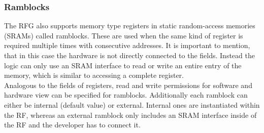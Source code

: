 \subsubsection{Ramblocks}\label{section::ramblocks}
The RFG also supports memory type registers in static random-access memories (SRAMs) called ramblocks. These are used when the same kind of register is required multiple times with consecutive addresses. It is important to mention, that in this case the hardware is not directly connected to the fields. Instead the logic can only use an SRAM interface to read or write an entire entry of the memory, which is similar to accessing a complete register.\\
Analogous to the fields of registers, read and write permissions for software and hardware view can be specified for ramblocks. Additionally each ramblock can either be internal (default value) or external. Internal ones are instantiated within the RF, whereas an external ramblock only includes an SRAM interface inside of the RF and the developer has to connect it.
